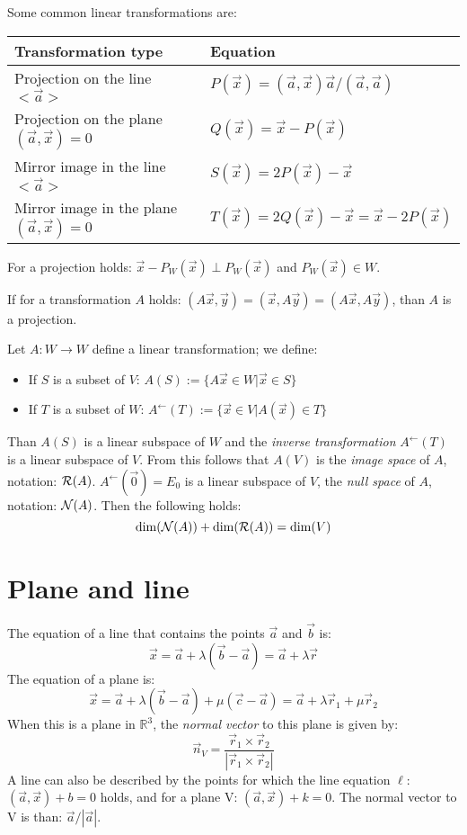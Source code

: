 Some common linear transformations are:
\begin{center}
	\begin{tabular}{||p{7cm}|p{6cm}||}
		\hline
		\bf Transformation type & \bf Equation\\
		\hline
		\hline
		Projection on the line $<\vec{a}>$             &$P(\vec{x})=(\vec{a},\vec{x})\vec{a}/(\vec{a},\vec{a})$\\
		Projection on the plane $(\vec{a},\vec{x})=0$ &$Q(\vec{x})=\vec{x}-P(\vec{x})$\\
		Mirror image in the line $<\vec{a}>$             &$S(\vec{x})=2P(\vec{x})-\vec{x}$\\
		Mirror image in the plane $(\vec{a},\vec{x})=0$&$T(\vec{x})=2Q(\vec{x})-\vec{x}=\vec{x}-2P(\vec{x})$\\
		\hline
	\end{tabular}
\end{center}
For a projection holds: $\vec{x}-P_W(\vec{x})\perp P_W(\vec{x})$ and
$P_W(\vec{x})\in W$.

If for a transformation $A$ holds: $(A\vec{x},\vec{y})=(\vec{x},A\vec{y})=(A\vec{x},A\vec{y})$,
than $A$ is a projection.

Let $A:W\rightarrow W$ define a linear transformation; we define:
\begin{itemize}
	\item If $S$ is a subset of $V$: $A(S):=\{A\vec{x}\in W|\vec{x}\in S\}$
	\item If $T$ is a subset of $W$: $A^\leftarrow(T):=\{\vec{x}\in V|A(\vec{x})\in T\}$
\end{itemize}
Than $A(S)$ is a linear subspace of $W$ and the {\it inverse transformation}
$A^\leftarrow(T)$ is a linear subspace of $V$. From this follows that $A(V)$ is
the {\it image space} of $A$, notation: ${\cal R}(A)$. $A^\leftarrow(\vec{0})=E_0$
is a linear subspace of $V$, the {\it null space} of $A$, notation:
${\cal N}(A)$. Then the following holds:
\[
{\rm dim}({\cal N}(A))+{\rm dim}({\cal R}(A))={\rm dim}(V)
\]

\section{Plane and line}
The equation of a line that contains the points $\vec{a}$ and $\vec{b}$ is:
\[
\vec{x}=\vec{a}+\lambda(\vec{b}-\vec{a})=\vec{a}+\lambda\vec{r}
\]
The equation of a plane is:
\[
\vec{x}=\vec{a}+\lambda(\vec{b}-\vec{a})+\mu(\vec{c}-\vec{a})=\vec{a}+\lambda\vec{r}_1+\mu\vec{r}_2
\]
When this is a plane in $ \mathbb{R}^3$, the {\it normal vector} to this plane is given
by:
\[
\vec{n}_V=\frac{\vec{r}_1\times\vec{r}_2}{|\vec{r}_1\times\vec{r}_2|}
\]
A line can also be described by the points for which the line equation
$\ell$: $(\vec{a},\vec{x})+b=0$ holds, and for a plane V: $(\vec{a},\vec{x})+k=0$.
The normal vector to V is than: $\vec{a}/|\vec{a}|$.

